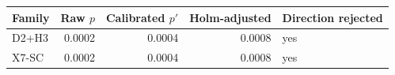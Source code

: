 \begin{tabular}{@{}lrrrl@{}}\toprule
Family & Raw $p$ & Calibrated $p'$ & Holm-adjusted & Direction rejected \\\midrule
D2+H3 & 0.0002 & 0.0004 & 0.0008 & yes \\
X7-SC & 0.0002 & 0.0004 & 0.0008 & yes \\
\bottomrule\end{tabular}
